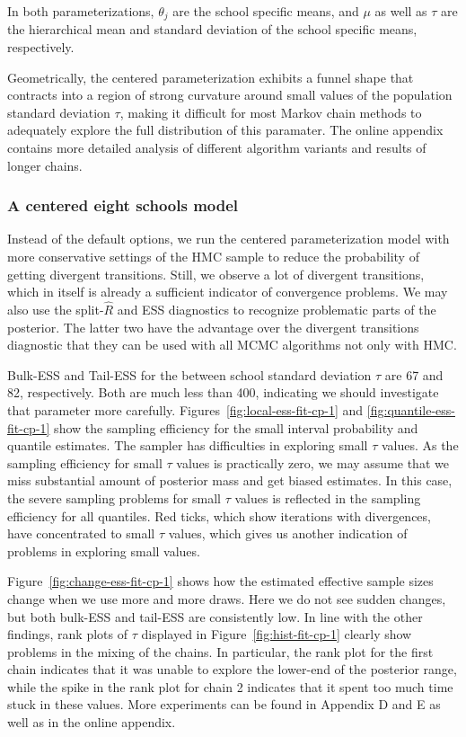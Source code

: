 \documentclass[american,]{article}
\theoremstyle{definition}
\begin{document}
In both parameterizations, $\theta_j$ are the school specific means,
and $\mu$ as well as $\tau$ are the hierarchical mean and standard deviation 
of the school specific means, respectively.

Geometrically, the centered parameterization exhibits a funnel shape
that contracts into a region of strong curvature around small
values of the population standard deviation $\tau$, making it difficult for most
Markov chain methods to adequately explore the full distribution of this
paramater. The online appendix contains more detailed analysis of different 
algorithm variants and results of longer chains.

\hypertarget{a-centered-eight-schools-model}{%
\subsubsection*{A centered eight schools
model}\label{a-centered-eight-schools-model}}

Instead of the default options, we run the centered parameterization
model with more conservative settings of the HMC sample to reduce the
probability of getting divergent transitions. Still, we observe a lot of divergent
transitions, which in itself is already a sufficient indicator of
convergence problems. We may also use the split-\(\widehat{R}\) and ESS
diagnostics to recognize problematic parts of the posterior. The latter
two have the advantage over the divergent transitions diagnostic that they
can be used with all MCMC algorithms not only with HMC.

Bulk-ESS and Tail-ESS for the between school standard deviation $\tau$
are 67 and 82, respectively. Both are much less than 400, indicating we
should investigate that parameter more carefully.
Figures~\ref{fig:local-ess-fit-cp-1} and
\ref{fig:quantile-ess-fit-cp-1} show the sampling efficiency for the
small interval probability and quantile estimates.
The sampler has difficulties in exploring small $\tau$ values. As the
sampling efficiency for small $\tau$ values is practically zero, we
may assume that we miss substantial amount of posterior mass and
get biased estimates. In this case, the severe sampling problems for
small $\tau$ values is reflected in the sampling efficiency for all
quantiles. Red ticks, which show iterations with divergences, have
concentrated to small $\tau$ values, which gives us another indication
of problems in exploring small values.

Figure~\ref{fig:change-ess-fit-cp-1} shows how the estimated effective
sample sizes change when we use more and more draws. Here we do not
see sudden changes, but both bulk-ESS and tail-ESS are consistently low. 
In line with the other findings, rank plots of $\tau$ displayed in
Figure~\ref{fig:hist-fit-cp-1} clearly show problems in the mixing of
the chains.  In particular, the rank plot for the first chain indicates that it was unable to 
explore the lower-end of the posterior range, while the spike in the rank plot 
for chain 2 indicates that it spent too much time stuck in these values.
More experiments can be found in Appendix D and E as well as in the online appendix.
\end{document}
